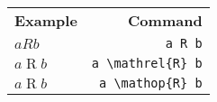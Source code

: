 \documentclass[varwidth,crop]{standalone}
\begin{document}
\begin{tabular}{lr}
    \textbf{Example} & \textbf{Command}\\
    $a R b$ & \verb|a R b|\\
    $a \mathrel{R} b$ & \verb|a \mathrel{R} b|\\
    $a \mathop{R} b$ & \verb|a \mathop{R} b|\\
\end{tabular}
\end{document}
